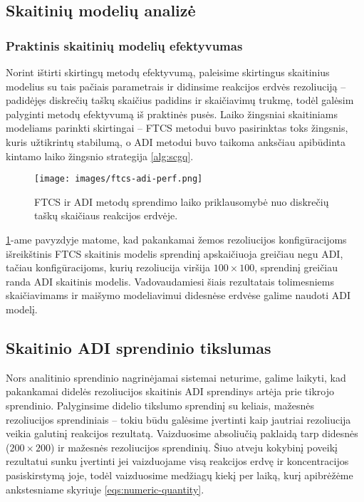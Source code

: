 \subsection{Skaitinių modelių analizė}


\subsubsection*{Praktinis skaitinių modelių efektyvumas}

Norint ištirti skirtingų metodų efektyvumą, paleisime skirtingus skaitinius modelius su tais pačiais parametrais ir didinsime reakcijos erdvės rezoliuciją -- padidėjęs diskrečių taškų skaičius padidins ir skaičiavimų trukmę, todėl galėsim palyginti metodų efektyvumą iš praktinės pusės. Laiko žingsniai skaitiniams modeliams parinkti skirtingai -- FTCS metodui buvo pasirinktas toks žingsnis, kuris užtikrintų stabilumą, o ADI metodui buvo taikoma anksčiau apibūdinta kintamo laiko žingsnio strategija \eqref{alg:scgq}.

\begin{figure}[h!]
  \centering
  \texttt{[image: images/ftcs-adi-perf.png]}
  \caption{FTCS ir ADI metodų sprendimo laiko priklausomybė nuo diskrečių taškų skaičiaus reakcijos erdvėje.}
  \label{fig:adi-ftcs-solve-time-comparison}
\end{figure}

\ref{fig:adi-ftcs-solve-time-comparison}-ame pavyzdyje matome, kad pakankamai žemos rezoliucijos konfigūracijoms išreikštinis FTCS skaitinis modelis sprendinį apskaičiuoja greičiau negu ADI, tačiau konfigūracijoms, kurių rezoliucija viršija $100\times100$, sprendinį greičiau randa ADI skaitinis modelis. Vadovaudamiesi šiais rezultatais tolimesniems skaičiavimams ir maišymo modeliavimui didesnėse erdvėse galime naudoti ADI modelį.

\subsection*{Skaitinio ADI sprendinio tikslumas}

Nors analitinio sprendinio nagrinėjamai sistemai neturime, galime laikyti, kad pakankamai didelės rezoliucijos skaitinis ADI sprendinys artėja prie tikrojo sprendinio. Palyginsime didelio tikslumo sprendinį su keliais, mažesnės rezoliucijos sprendiniais -- tokiu būdu galėsime įvertinti kaip jautriai rezoliucija veikia galutinį reakcijos rezultatą. Vaizduosime absoliučią paklaidą tarp didesnės ($200\times200$) ir mažesnės rezoliucijos sprendinių. Šiuo atveju kokybinį poveikį rezultatui sunku įvertinti jei vaizduojame visą reakcijos erdvę ir koncentracijos pasiskirstymą joje, todėl vaizduosime medžiagų kiekį per laiką, kurį apibrėžėme ankstesniame skyriuje \eqref{eqs:numeric-quantity}.

